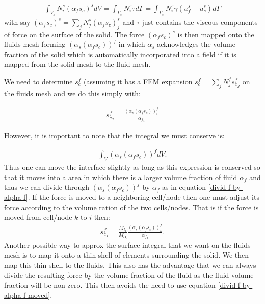 \begin{eqnarray}
\int_{V_s} N_i^s (\alpha_f s_c)^s dV= \int_{\Gamma_s} N_i^s \tau d\Gamma = \int_{\Gamma_s} N_i^s \gamma (u^s_f - u^s_s) d\Gamma
\end{eqnarray}
with say $(\alpha_f s_c)^s=\sum_j N_j^s (\alpha_f s_c)^s_j$ 
and $\tau$ just contains the viscous components of force 
on the surface of the solid. The force $(\alpha_f s_c)^s$ is 
then mapped onto the fluids mesh forming $(\alpha_s(\alpha_f s_c))^f$ 
in which $\alpha_s$ acknowledges the volume fraction of the 
solid which is automatically incorporated into 
a field if it is mapped from the solid mesh 
to the fluid mesh. 

We need to determine $s_c^f$ (assuming it has a FEM expansion 
$s_c^f=\sum_j N_j^f {s_c^f}_j$ on the fluids mesh and we 
do this simply with: 

\begin{eqnarray}
{s_c^f}_i= \frac{(\alpha_s(\alpha_f s_c))^f_i}{{\alpha_f}_i}
\label{divid-f-by-alpha-f}
\end{eqnarray}

However, it is important to note that the integral we 
must conserve is: 

\begin{eqnarray}
\int_V (\alpha_s(\alpha_f s_c))^f dV.
\end{eqnarray}
Thus one can move the interface slightly as long as this expression 
is conserved so that it moves into a area in which there is a 
larger volume fraction of fluid $\alpha_f$ and thus we 
can divide through $(\alpha_s(\alpha_f s_c))^f$ by $\alpha_f$ as in equation 
\ref{divid-f-by-alpha-f}. If the force is moved to a neighboring cell/node 
then one must adjust its force according to the volume ration 
of the two cells/nodes. That is if the force is moved 
from cell/node $k$ to $i$ then: 
\begin{eqnarray}
{s_c^f}_i= \frac{{M_l}_i}{{M_l}_k} \frac{(\alpha_s(\alpha_f s_c))^f_k}{{\alpha_f}_i}. 
\label{divid-f-by-alpha-f-moved}
\end{eqnarray}
Another possible way to approx the surface integral that we want on the 
fluids mesh is to map it onto a thin shell of elements surrounding the solid. 
We then map this thin shell to the fluids. 
This also has the advantage that we can always divide the resulting force by the 
volume fraction of the fluid as the fluid volume fraction will be non-zero. 
This then avoids the need to use equation \ref{divid-f-by-alpha-f-moved}. 


